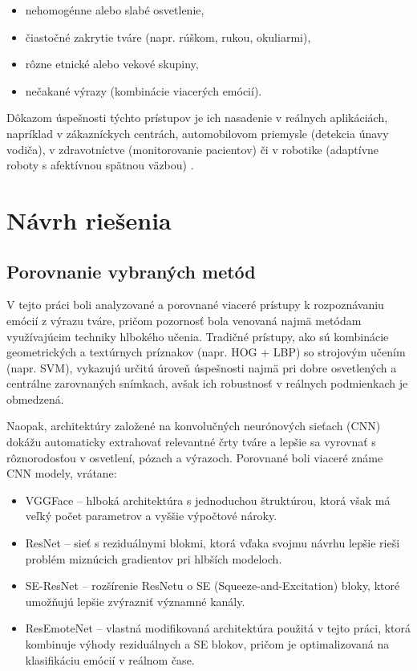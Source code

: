 \begin{itemize}
    \item nehomogénne alebo slabé osvetlenie,
    \item čiastočné zakrytie tváre (napr. rúškom, rukou, okuliarmi),
    \item rôzne etnické alebo vekové skupiny,
    \item nečakané výrazy (kombinácie viacerých emócií).
\end{itemize}

Dôkazom úspešnosti týchto prístupov je ich nasadenie v reálnych aplikáciách, napríklad v zákazníckych centrách, automobilovom priemysle (detekcia únavy vodiča), v zdravotníctve (monitorovanie pacientov) či v robotike (adaptívne roboty s afektívnou spätnou väzbou) \cite{inProceedings01}.


\section{Návrh riešenia}        %
\label{sec:solution_design}
\subsection{Porovnanie vybraných metód}
V tejto práci boli analyzované a porovnané viaceré prístupy k rozpoznávaniu emócií z výrazu tváre, pričom pozornosť bola venovaná najmä metódam využívajúcim techniky hlbokého učenia. Tradičné prístupy, ako sú kombinácie geometrických a textúrnych príznakov (napr. HOG + LBP) so strojovým učením (napr. SVM), vykazujú určitú úroveň úspešnosti najmä pri dobre osvetlených a centrálne zarovnaných snímkach, avšak ich robustnosť v reálnych podmienkach je obmedzená.

Naopak, architektúry založené na konvolučných neurónových sieťach (CNN) dokážu automaticky extrahovať relevantné črty tváre a lepšie sa vyrovnať s rôznorodosťou v osvetlení, pózach a výrazoch. Porovnané boli viaceré známe CNN modely, vrátane:
\begin{itemize}
    \item VGGFace – hlboká architektúra s jednoduchou štruktúrou, ktorá však má veľký počet parametrov a vyššie výpočtové nároky.
    \item ResNet – sieť s reziduálnymi blokmi, ktorá vďaka svojmu návrhu lepšie rieši problém miznúcich gradientov pri hlbších modeloch.
    \item SE-ResNet – rozšírenie ResNetu o SE (Squeeze-and-Excitation) bloky, ktoré umožňujú lepšie zvýrazniť významné kanály.
    \item ResEmoteNet – vlastná modifikovaná architektúra použitá v tejto práci, ktorá kombinuje výhody reziduálnych a SE blokov, pričom je optimalizovaná na klasifikáciu emócií v reálnom čase.
\end{itemize}

